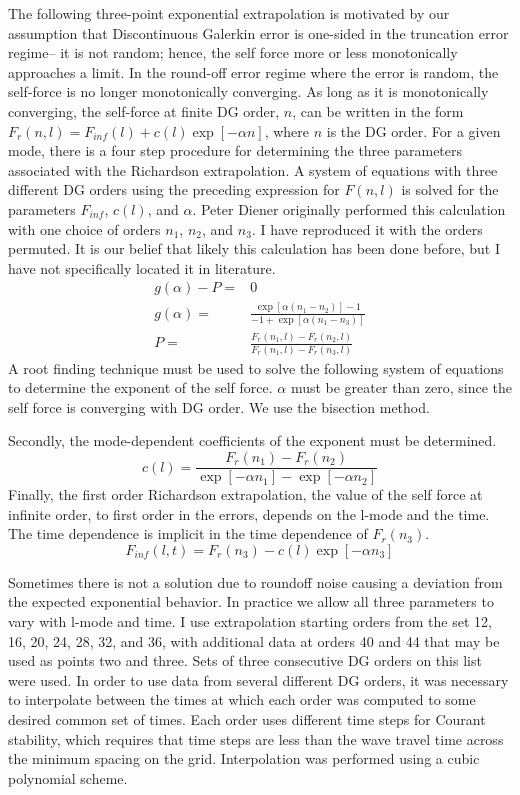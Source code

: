 The following three-point exponential extrapolation is motivated by our assumption that Discontinuous Galerkin error is one-sided in the truncation error regime-- it is not random; hence, the self force more or less monotonically approaches a limit. In the round-off error regime where the error is random, the self-force is no longer monotonically converging. As long as it is monotonically converging, the self-force at finite DG order, $n$, can be written in the form $F_r(n,l)=F_{inf}(l)+c(l)\exp[-\alpha n]$, where $n$ is the DG order. For a given mode, there is a four step procedure for determining the three parameters associated with the Richardson extrapolation. A system of equations with three different DG orders using the preceding expression for $F(n,l)$ is solved for the parameters $F_{inf}$, $c(l)$, and $\alpha$. Peter Diener originally performed this calculation with one choice of orders $n_1$, $n_2$, and $n_3$. I have reproduced it with the orders permuted. It is our belief that likely this calculation has been done before, but I have not specifically located it in literature. 
\begin{eqnarray}
g(\alpha)-P=&0\\
g(\alpha)=&\frac{\exp[\alpha(n_1-n_2)]-1}{-1+\exp[\alpha(n_1-n_3)]}\\
P=&\frac{F_r(n_1,l)-F_r(n_2,l)}{F_r(n_1,l)-F_r(n_3,l)}
\end{eqnarray}
A root finding technique must be used to solve the following system of equations to determine the exponent of the self force. $\alpha$ must be greater than zero, since the self force is converging with DG order. We use the bisection method. 

Secondly, the mode-dependent coefficients of the exponent must be determined.
\begin{equation}
c(l)=\frac{F_r(n_1)-F_r(n_2)}{\exp[-\alpha n_1]-\exp[-\alpha n_2]}
\end{equation}
Finally, the first order Richardson extrapolation, the value of the self force at infinite order, to first order in the errors, depends on the l-mode and the time. The time dependence is implicit in the time dependence of $F_r(n_3)$. 
\begin{equation}
F_{inf}(l,t)=F_r(n_3)-c(l)\exp[-\alpha n_3]
\end{equation}

Sometimes there is not a solution due to roundoff noise causing a deviation from the expected exponential behavior. In practice we allow all three parameters to vary with l-mode and time. I use extrapolation starting orders from the set 12, 16, 20, 24, 28, 32, and 36, with additional data at orders 40 and 44 that may be used as points two and three. Sets of three consecutive DG orders on this list were used. In order to use data from several different DG orders, it was necessary to interpolate between the times at which each order was computed to some desired common set of times. Each order uses different time steps for Courant stability, which requires that time steps are less than the wave travel time across the minimum spacing on the grid. Interpolation was performed using a cubic polynomial scheme. 


